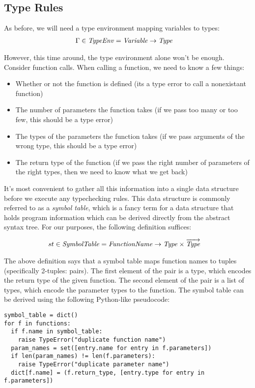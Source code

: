 \subsection{Type Rules}
As before, we will need a type environment mapping variables to types:
\begin{align*}
  \Gamma \in \mathit{TypeEnv} &= \mathit{Variable} \to \mathit{Type}
\end{align*}

However, this time around, the type environment alone won't be enough.
Consider function calls.
When calling a function, we need to know a few things:
\begin{itemize}
\item Whether or not the function is defined (its a type error to call a nonexistant function)
\item The number of parameters the function takes (if we pass too many or too few, this should be a type error)
\item The types of the parameters the function takes (if we pass arguments of the wrong type, this should be a type error)
\item The return type of the function (if we pass the right number of parameters of the right types, then we need to know what we get back)
\end{itemize}

It's most convenient to gather all this information into a single data structure before we execute any typechecking rules.
This data structure is commonly referred to as a \emph{symbol table}, which is a fancy term for a data structure that holds program information which can be derived directly from the abstract syntax tree.
For our purposes, the following definition suffices:

\begin{align*}
  st \in \mathit{SymbolTable} &= \mathit{FunctionName} \to \mathit{Type} \times \overrightarrow{\mathit{Type}}
\end{align*}

The above definition says that a symbol table maps function names to tuples (specifically 2-tuples: pairs).
The first element of the pair is a type, which encodes the return type of the given function.
The second element of the pair is a list of types, which encode the parameter types to the function.
The symbol table can be derived using the following Python-like pseudocode:
\begin{verbatim}
symbol_table = dict()
for f in functions:
  if f.name in symbol_table:
    raise TypeError("duplicate function name")
  param_names = set([entry.name for entry in f.parameters])
  if len(param_names) != len(f.parameters):
    raise TypeError("duplicate parameter name")
  dict[f.name] = (f.return_type, [entry.type for entry in f.parameters])
\end{verbatim}

